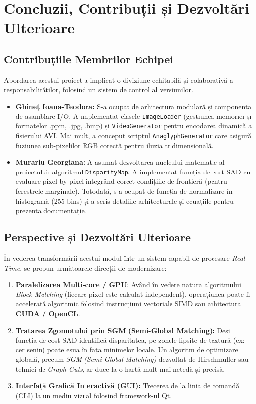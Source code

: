 \documentclass[12pt,a4paper]{report}
\begin{document}
\chapter{Concluzii, Contribuții și Dezvoltări Ulterioare}

\section{Contribuțiile Membrilor Echipei}
Abordarea acestui proiect a implicat o diviziune echitabilă și colaborativă a responsabilităților, folosind un sistem de control al versiunilor.
\begin{itemize}
    \item \textbf{Ghineț Ioana-Teodora:} S-a ocupat de arhitectura modulară și componenta de asamblare I/O. A implementat clasele \texttt{ImageLoader} (gestiunea memoriei și formatelor .ppm, .jpg, .bmp) și \texttt{VideoGenerator} pentru encodarea dinamică a fișierului AVI. Mai mult, a conceput scriptul \texttt{AnaglyphGenerator} care asigură fuziunea sub-pixelilor RGB corectă pentru iluzia tridimensională.
    \item \textbf{Murariu Georgiana:} A asumat dezvoltarea nucleului matematic al proiectului: algoritmul \texttt{DisparityMap}. A implementat funcția de cost SAD cu evaluare pixel-by-pixel integrând corect condițiile de frontieră (pentru ferestrele marginale). Totodată, s-a ocupat de funcția de normalizare în histogramă (255 bins) și a scris detaliile arhitecturale și ecuațiile pentru prezenta documentație.
\end{itemize}

\section{Perspective și Dezvoltări Ulterioare}
În vederea transformării acestui modul într-un sistem capabil de procesare \textit{Real-Time}, se propun următoarele direcții de modernizare:
\begin{enumerate}
    \item \textbf{Paralelizarea Multi-core / GPU:} Având în vedere natura algoritmului \textit{Block Matching} (fiecare pixel este calculat independent), operațiunea poate fi accelerată algoritmic folosind instrucțiuni vectoriale SIMD sau arhitectura \textbf{CUDA / OpenCL}.
    \item \textbf{Tratarea Zgomotului prin SGM (Semi-Global Matching):} Deși funcția de cost SAD identifică disparitatea, pe zonele lipsite de textură (ex: cer senin) poate eșua în fața minimelor locale. Un algoritm de optimizare globală, precum \textit{SGM (Semi-Global Matching)} dezvoltat de Hirschmuller sau tehnici de \textit{Graph Cuts}, ar duce la o hartă mult mai netedă și precisă.
    \item \textbf{Interfață Grafică Interactivă (GUI):} Trecerea de la linia de comandă (CLI) la un mediu vizual folosind framework-ul Qt.
\end{enumerate}
\end{document}

